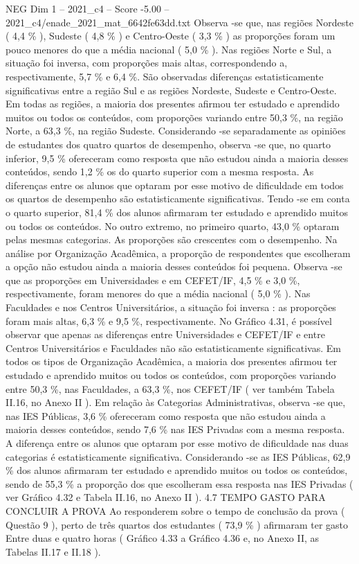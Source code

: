 \begin{textsample}{NEG Dim 1 – 2021\_c4 – Score -5.00 – 2021\_c4/enade\_2021\_mat\_6642fe63dd.txt}
Observa -se que, nas regiões Nordeste ( 4,4 \% ), Sudeste ( 4,8 \% ) e Centro-Oeste ( 3,3 \% ) as proporções foram um pouco menores do que a média nacional ( 5,0 \% ).
Nas regiões Norte e Sul, a situação foi inversa, com proporções mais altas, correspondendo a, respectivamente, 5,7 \% e 6,4 \%.
São observadas diferenças estatisticamente significativas entre a região Sul e as regiões Nordeste, Sudeste e Centro-Oeste.
Em todas as regiões, a maioria dos presentes afirmou ter estudado e aprendido muitos ou todos os conteúdos, com proporções variando entre 50,3 \%, na região Norte, a 63,3 \%, na região Sudeste.
Considerando -se separadamente as opiniões de estudantes dos quatro quartos de desempenho, observa -se que, no quarto inferior, 9,5 \% ofereceram como resposta que não estudou ainda a maioria desses conteúdos, sendo 1,2 \% os do quarto superior com a mesma resposta.
As diferenças entre os alunos que optaram por esse motivo de dificuldade em todos os quartos de desempenho são estatisticamente significativas.
Tendo -se em conta o quarto superior, 81,4 \% dos alunos afirmaram ter estudado e aprendido muitos ou todos os conteúdos.
No outro extremo, no primeiro quarto, 43,0 \% optaram pelas mesmas categorias.
As proporções são crescentes com o desempenho.
Na análise por Organização Acadêmica, a proporção de respondentes que escolheram a opção não estudou ainda a maioria desses conteúdos foi pequena.
Observa -se que as proporções em Universidades e em CEFET/IF, 4,5 \% e 3,0 \%, respectivamente, foram menores do que a média nacional ( 5,0 \% ).
Nas Faculdades e nos Centros Universitários, a situação foi inversa : as proporções foram mais altas, 6,3 \% e 9,5 \%, respectivamente.
No Gráfico 4.31, é possível observar que apenas as diferenças entre Universidades e CEFET/IF e entre Centros Universitários e Faculdades não são estatisticamente significativas.
Em todos os tipos de Organização Acadêmica, a maioria dos presentes afirmou ter estudado e aprendido muitos ou todos os conteúdos, com proporções variando entre 50,3 \%, nas Faculdades, a 63,3 \%, nos CEFET/IF ( ver também Tabela II.16, no Anexo II ).
Em relação às Categorias Administrativas, observa -se que, nas IES Públicas, 3,6 \% ofereceram como resposta que não estudou ainda a maioria desses conteúdos, sendo 7,6 \% nas IES Privadas com a mesma resposta.
A diferença entre os alunos que optaram por esse motivo de dificuldade nas duas categorias é estatisticamente significativa.
Considerando -se as IES Públicas, 62,9 \% dos alunos afirmaram ter estudado e aprendido muitos ou todos os conteúdos, sendo de 55,3 \% a proporção dos que escolheram essa resposta nas IES Privadas ( ver Gráfico 4.32 e Tabela II.16, no Anexo II ). 4.7 TEMPO GASTO PARA CONCLUIR A PROVA Ao responderem sobre o tempo de conclusão da prova ( Questão 9 ), perto de três quartos dos estudantes ( 73,9 \% ) afirmaram ter gasto Entre duas e quatro horas ( Gráfico 4.33 a Gráfico 4.36 e, no Anexo II, as Tabelas II.17 e II.18 ).

\end{textsample}

